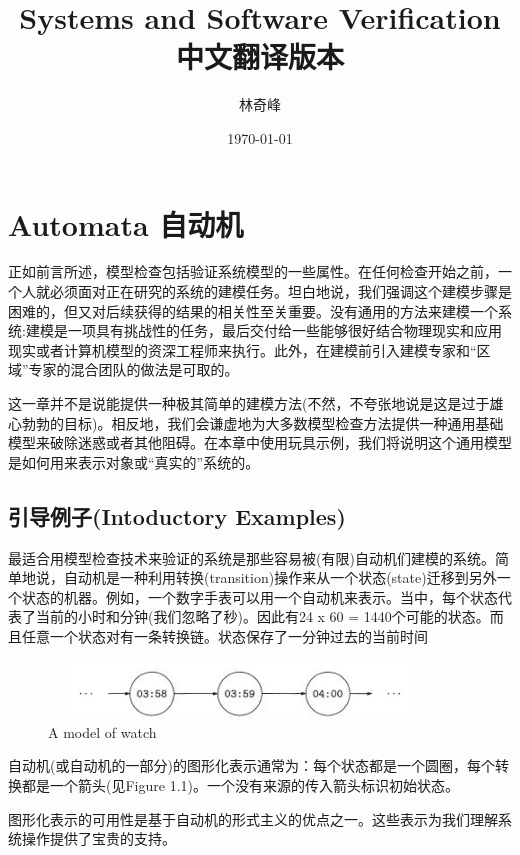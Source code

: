\documentclass{book}
\begin{document}
\title{Systems and Software Verification中文翻译版本}
\author{林奇峰}
\date{\today}
\maketitle
    \chapter{Automata 自动机}

    正如前言所述，模型检查包括验证系统模型的一些属性。在任何检查开始之前，一个人就必须面对正在研究的系统的建模任务。坦白地说，我们强调这个建模步骤是困难的，但又对后续获得的结果的相关性至关重要。没有通用的方法来建模一个系统:建模是一项具有挑战性的任务，最后交付给一些能够很好结合物理现实和应用现实或者计算机模型的资深工程师来执行。此外，在建模前引入建模专家和“区域”专家的混合团队的做法是可取的。

    这一章并不是说能提供一种极其简单的建模方法(不然，不夸张地说是这是过于雄心勃勃的目标)。相反地，我们会谦虚地为大多数模型检查方法提供一种通用基础模型来破除迷惑或者其他阻碍。在本章中使用玩具示例，我们将说明这个通用模型是如何用来表示对象或“真实的”系统的。

    \section{引导例子(Intoductory Examples)}

    最适合用模型检查技术来验证的系统是那些容易被(有限)自动机们建模的系统。简单地说，自动机是一种利用转换(transition)操作来从一个状态(state)迁移到另外一个状态的机器。例如，一个数字手表可以用一个自动机来表示。当中，每个状态代表了当前的小时和分钟(我们忽略了秒)。因此有24 x 60 = 1440个可能的状态。而且任意一个状态对有一条转换链。状态保存了一分钟过去的当前时间
    \begin{figure}
    \centering
    \includegraphics[height=0.6in,width=4.0in]{1_1.jpg}
    \caption{A model of watch}
    \end{figure}

    自动机(或自动机的一部分)的图形化表示通常为：每个状态都是一个圆圈，每个转换都是一个箭头(见Figure 1.1)。一个没有来源的传入箭头标识初始状态。

    图形化表示的可用性是基于自动机的形式主义的优点之一。这些表示为我们理解系统操作提供了宝贵的支持。
\end{document}
